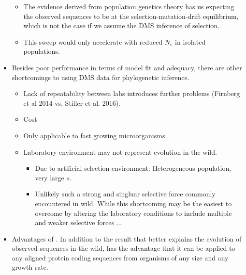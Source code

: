 \documentclass[12pt]{article}
\begin{document}
\begin{itemize}
\begin{itemize}
  \item The evidence derived from population genetics theory has us expecting the observed sequences to be at the selection-mutation-drift equilibrium, which is not the case if we assume the DMS inference of selection.
  \item This sweep would only accelerate with reduced $N_e$ in isolated populations.
  \end{itemize}

\item Besides poor performance in terms of model fit and adequacy, there are other shortcomings to using DMS data for phylogenetic inference.
  \begin{itemize}
  \item Lack of repeatability between labs introduces further problems (Firnberg et al 2014 vs. Stifler et al. 2016).
  \item Cost
  \item Only applicable to fast growing microorganisms.
  \item Laboratory environment may not represent evolution in the wild.
    \begin{itemize}
    \item Due to artificial selection environment; Heterogeneous population, very large $s$.
    \item Unlikely such a strong and singluar selective force commonly encountered in wild.  While this shortcoming may be the easiest to overcome by altering the laboratory conditions to include multiple and weaker selective forces ...
    \end{itemize}
  \end{itemize}

\item Advantages of \selac.  In addition to the result that \selac better explains the evolution of observed sequences in the wild, \selac has the advantage that it can be applied to any aligned protein coding sequences from organisms of any size and any growth rate.


\end{itemize}
\end{document}
